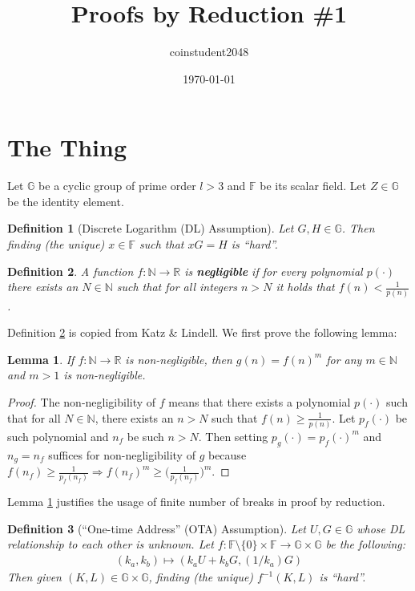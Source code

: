 \documentclass{article}
\title{Proofs by Reduction \#1}
\author{coinstudent2048}
\date{\today}
\newtheorem{definition}{Definition}[section]
\newtheorem{lemma}[theorem]{Lemma}
\begin{document}
\maketitle


\section{The Thing}
\noindent Let $\mathbb{G}$ be a cyclic group of prime order $l>3$ and $\mathbb{F}$ be its scalar field. Let $Z\in\mathbb{G}$ be the identity element.

\begin{definition}[Discrete Logarithm (DL) Assumption]
Let $G, H\in\mathbb{G}$. Then finding (the unique) $x\in\mathbb{F}$ such that $xG=H$ is ``hard''.
\end{definition}

\begin{definition}\label{negl}
A function $f:\mathbb{N}\rightarrow\mathbb{R}$ is \textbf{\em negligible} if for every polynomial $p(\cdot)$ there exists an $N\in\mathbb{N}$ such that for all integers $n>N$ it holds that $f(n)<\frac{1}{p(n)}$.
\end{definition}

\noindent Definition \ref{negl} is copied from Katz \& Lindell. We first prove the following lemma:

\begin{lemma}\label{negl-exp}
If $f:\mathbb{N}\rightarrow\mathbb{R}$ is non-negligible, then $g(n)=f(n)^m$ for any $m\in\mathbb{N}$ and $m>1$ is non-negligible.
\end{lemma}
\begin{proof}
The non-negligibility of $f$ means that there exists a polynomial $p(\cdot)$ such that for all $N\in\mathbb{N}$, there exists an $n>N$ such that $f(n)\ge\frac{1}{p(n)}$. Let $p_f(\cdot)$ be such polynomial and $n_f$ be such $n>N$. Then setting $p_g(\cdot)=p_f(\cdot)^m$ and $n_g=n_f$ suffices for non-negligibility of $g$ because $f(n_f)\ge\frac{1}{p_f(n_f)}\Rightarrow f(n_f)^m\ge\big(\frac{1}{p_f(n_f)}\big)^m$.
\end{proof}

\noindent Lemma \ref{negl-exp} justifies the usage of finite number of breaks in proof by reduction.

\begin{definition}[``One-time Address'' (OTA) Assumption]
Let $U, G\in\mathbb{G}$ whose DL relationship to each other is unknown. Let $f:\mathbb{F}\setminus\{0\}\times\mathbb{F}\rightarrow\mathbb{G}\times\mathbb{G}$ be the following:
\begin{align*}
    (k_a, k_b) \mapsto (k_a U + k_b G, (1/k_a)G)
\end{align*}
Then given $(K, L)\in\mathbb{G}\times\mathbb{G}$, finding (the unique) $f^{-1}(K,L)$ is ``hard''.
\end{definition}
\end{document}
